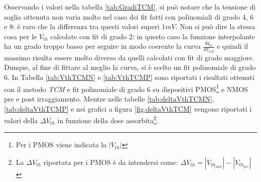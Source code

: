 Osservando i valori nella tabella \ref{tab:GradiTCM}, si può notare che la tensione di soglia ottenuta non varia molto nel caso dei fit fatti con polinomiali di grado 4, 6 e 8: è raro che la differenza tra questi valori superi $1 mV$. Non si può dire la stessa cosa per le $V_{th}$ calcolate con fit di grado 2: in questo caso la funzione interpolante ha un grado troppo basso per seguire in modo coerente la curva $\frac{dg_m}{dV_{GS}}$ e quindi il massimo risulta essere molto diverso da quelli calcolati con fit di grado maggiore. Dunque, al fine di fittare al meglio la curva, si è scelto un fit polinomiale di grado 6. In Tabella \ref{tab:VthTCMN} e \ref{tab:VthTCMP} sono riportati i risultati ottenuti con il metodo \emph{TCM} e fit polinomiale di grado 6 su dispositivi PMOS\footnote{Per i PMOS viene indicata la $|V_{th}|$ } e NMOS pre e post irraggiamento.
Mentre nelle tabelle \ref{tab:deltaVthTCMN}, \ref{tab:deltaVthTCMP} e nei grafici a figura \ref{fig:deltaVthTCM} vengono riportati i valori della $\Delta V_{th}$ in funzione della dose assorbita\footnote{La $\Delta V_{th} $ riportata per i PMOS è da intendersi come: $\Delta V_{th} = |V_{th_{post}}| - |V_{th_{pre}}|$}.

\clearpage


